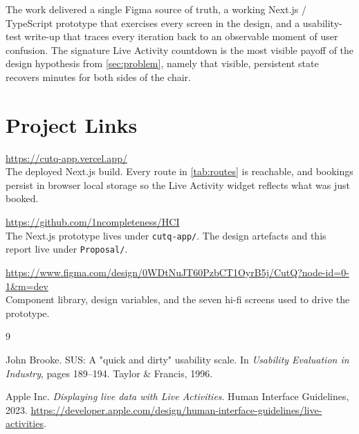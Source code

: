 \documentclass[12pt,a4paper]{article}
\begin{document}
The work delivered a single Figma source of truth, a working
Next.js / TypeScript prototype that exercises every screen in the
design, and a usability-test write-up that traces every iteration
back to an observable moment of user confusion. The signature
Live Activity countdown is the most visible payoff of the design
hypothesis from \cref{sec:problem}, namely that visible, persistent
state recovers minutes for both sides of the chair.

\section{Project Links}
\label{sec:links}

\begin{description}[leftmargin=2.2em,style=nextline]
  \item[Live prototype (Vercel)]
    \url{https://cutq-app.vercel.app/}\\
    The deployed Next.js build. Every route in \cref{tab:routes} is
    reachable, and bookings persist in browser local storage so the
    Live Activity widget reflects what was just booked.
  \item[Source code (GitHub)]
    \url{https://github.com/1ncompleteness/HCI}\\
    The Next.js prototype lives under \texttt{cutq-app/}. The design
    artefacts and this report live under \texttt{Proposal/}.
  \item[Figma design file]
    \url{https://www.figma.com/design/0WDtNuJT60PzbCT1OyrB5j/CutQ?node-id=0-1\&m=dev}\\
    Component library, design variables, and the seven hi-fi screens
    used to drive the prototype.
\end{description}

\begin{thebibliography}{9}

John Brooke.
\newblock SUS: A "quick and dirty" usability scale.
\newblock In \emph{Usability Evaluation in Industry}, pages 189--194.
  Taylor \& Francis, 1996.

Apple Inc.
\newblock \emph{Displaying live data with Live Activities}.
\newblock Human Interface Guidelines, 2023.
\newblock \url{https://developer.apple.com/design/human-interface-guidelines/live-activities}.

\end{thebibliography}
\end{document}
